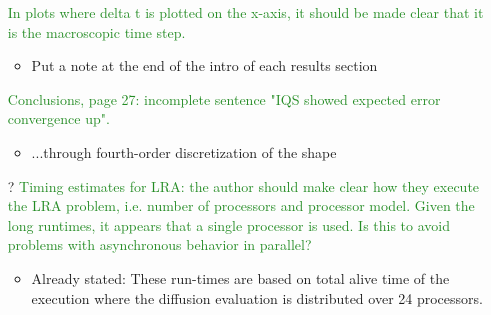 \documentclass{elsarticle}
\newcommand{\nofix}{?}
\newcommand{\done}{\checkmark}
\newcommand{\easy}[1]{\textcolor{ForestGreen}{#1}}
\begin{document}
\begin{itemize}
\item[\done] \easy{ In plots where delta t is plotted on the x-axis, it should be made clear that it is the macroscopic time step. }
\begin{itemize}
\item Put a note at the end of the intro of each results section
\end{itemize}

\item[\done] \easy{ Conclusions, page 27: incomplete sentence "IQS showed expected error convergence up". }
\begin{itemize}
\item ...through fourth-order discretization of the shape
\end{itemize}

\item[\nofix] \easy{ Timing estimates for LRA: the author should make clear how they execute the LRA problem, i.e. number of processors and processor model. Given the long runtimes, it appears that a single processor is used. Is this to avoid problems with asynchronous behavior in parallel? }
\begin{itemize}
\item Already stated: These run-times are based on total alive time of the execution where the diffusion evaluation is distributed over 24 processors.
\end{itemize}

\end{itemize}
\end{document}
